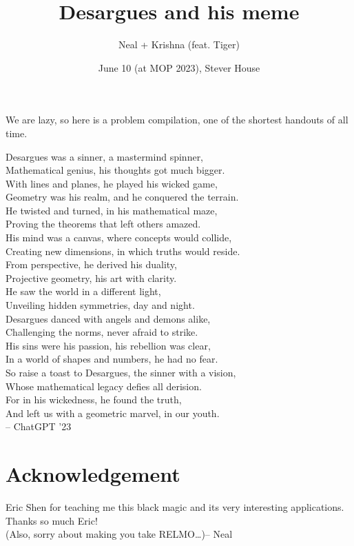 \documentclass{seto}
\title{Desargues and his meme }
\author{Neal + Krishna (feat. Tiger)}
\date{June 10 (at MOP 2023), Stever House}
\begin{document}
\maketitle
We are lazy, so here is a problem compilation, one of the shortest handouts of all time.
\begin{block}
Desargues was a sinner, a mastermind spinner,\\
Mathematical genius, his thoughts got much bigger.\\
With lines and planes, he played his wicked game,\\
Geometry was his realm, and he conquered the terrain.\\[6pt]

He twisted and turned, in his mathematical maze,\\
Proving the theorems that left others amazed.\\
His mind was a canvas, where concepts would collide,\\
Creating new dimensions, in which truths would reside.\\[6pt]

From perspective, he derived his duality,\\
Projective geometry, his art with clarity.\\
He saw the world in a different light,\\
Unveiling hidden symmetries, day and night.\\[6pt]
%
Desargues danced with angels and demons alike,\\
Challenging the norms, never afraid to strike.\\
His sins were his passion, his rebellion was clear,\\
In a world of shapes and numbers, he had no fear.\\[6pt]

So raise a toast to Desargues, the sinner with a vision,\\
Whose mathematical legacy defies all derision.\\
For in his wickedness, he found the truth,\\
And left us with a geometric marvel, in our youth.\\
\hfill-- ChatGPT '23
\end{block}
\setcounter{section}{-1}
\section{Acknowledgement}
Eric Shen for teaching me this black magic and its very interesting applications. Thanks so much Eric!\\
(Also, sorry about making you take RELMO\dots)\hfill -- Neal
\end{document}
